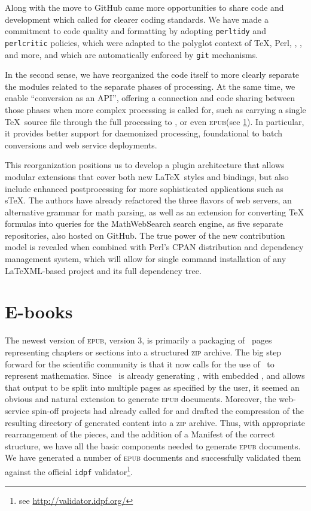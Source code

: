 \documentclass{llncs}
\def\ebooks{\mbox{E-books}\xspace}
\def\epub{\textsc{epub}\xspace}
\def\zip{\textsc{zip}\xspace}
\begin{document}
Along with the move to GitHub came more opportunities to share
code and development which called for clearer coding standards.
We have made a commitment to code quality and formatting by
adopting \texttt{perltidy} and \texttt{perlcritic} policies,
which were adapted to the polyglot context of \TeX, Perl, \XML,
\XSLT, and more, and which are automatically enforced by \texttt{git} mechanisms.

In the second sense, we have reorganized the code itself to more clearly
separate the modules related to the separate phases of processing.
At the same time, we enable ``conversion as an API'', offering a connection and code sharing between those phases when more
complex processing is called for, such as carrying a single \TeX\ source
file through the full processing to \HTML, or even \epub (see \ref{ebooks}).
In particular, it provides better support for daemonized processing, foundational to batch conversions and web service deployments.

This reorganization positions us to develop a plugin architecture that allows modular extensions
that cover both new \LaTeX\ styles and bindings, but also
include enhanced postprocessing for more sophisticated applications
such as s\TeX. The authors have already refactored the three flavors of {\LaTeXML} web servers, an alternative grammar for math parsing,
as well as an extension for converting {\TeX} formulas into queries for the MathWebSearch search engine, as five separate repositories, also hosted on GitHub.
The true power of the new contribution model is revealed when combined with Perl's CPAN distribution and dependency management system,
 which will allow for single command installation of any LaTeXML-based project and its full dependency tree.

\section{\ebooks}\label{ebooks}
The newest version of \epub, version 3, is primarily a packaging
of \HTML\ pages representing chapters or sections into a structured
\zip archive. The big step forward for the scientific community
is that it now calls for the use of \MathML\
to represent mathematics. Since \LaTeXML\ is already generating \HTML,
with embedded \MathML, and allows that output to be split into
multiple pages as specified by the user, it seemed an obvious
and natural extension to generate \epub documents. Moreover, the
web-service spin-off projects had already called for and drafted the compression of the resulting
directory of generated content into a \zip
archive.  Thus, with appropriate rearrangement of the pieces,
and the addition of a Manifest of the correct structure,
we have all the basic components needed to generate \epub documents. We have generated a number of \epub documents and successfully validated them against the official \texttt{idpf} validator\footnote{see \url{http://validator.idpf.org/}}.
\end{document}

